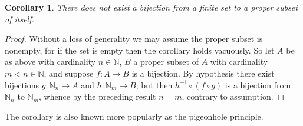 \documentclass[12pt]{article}
\theoremstyle{plain}
\newtheorem*{cor}{Corollary}
\begin{document}
\begin{cor}
There does not exist a bijection from a finite set to a proper subset of itself. 
\end{cor}
\begin{proof}
Without a loss of generality we may assume the proper subset is nonempty, for if the set is empty then the corollary holds vacuously. So let $A$ be as above with cardinality $n\in\mathbb{N}$, $B$ a proper subset of $A$ with cardinality $m<n\in\mathbb{N}$, and suppose $f:A\rightarrow B$ is a bijection. By hypothesis there exist bijections $g:\mathbb{N}_n\rightarrow A$ and $h:\mathbb{N}_m\rightarrow B$; but then $h^{-1}\circ(f\circ g)$ is a bijection from $\mathbb{N}_n$ to $\mathbb{N}_m$, whence by the preceding result $n=m$, contrary to assumption.  
\end{proof}

The corollary is also known more popularly as the pigeonhole principle.
\end{document}
